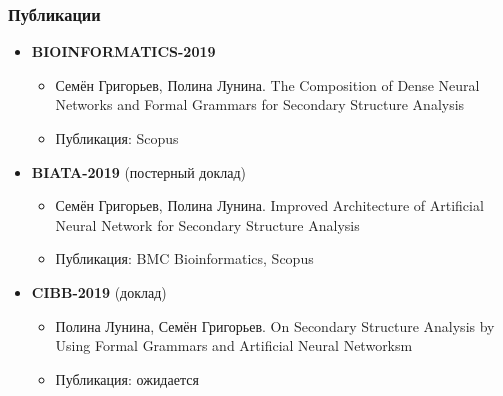 \documentclass{beamer}
\begin{document}
\begin{frame}\frametitle{Публикации}
\begin{itemize}
    \item \textbf{BIOINFORMATICS-2019}
      \begin{itemize}
        \item Семён Григорьев, Полина Лунина. The Composition of Dense Neural Networks and Formal Grammars for Secondary Structure Analysis
        \item Публикация: Scopus
      \end{itemize}
      \item \textbf{BIATA-2019} (постерный доклад)
      \begin{itemize}
         \item Семён Григорьев, Полина Лунина. Improved Architecture of Artificial Neural Network for Secondary Structure Analysis
         \item Публикация: BMC Bioinformatics, Scopus
      \end{itemize}
      \item \textbf{CIBB-2019} (доклад)
      \begin{itemize}
        \item Полина Лунина, Семён Григорьев. On Secondary Structure Analysis by Using Formal Grammars and Artificial Neural Networksm
        \item Публикация: ожидается
      \end{itemize}
\end{itemize}

\end{frame}
\end{document}
